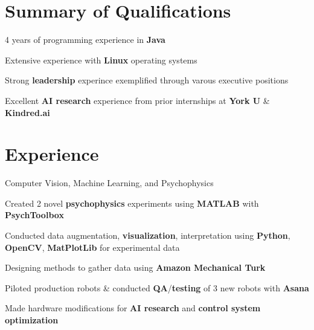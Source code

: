 \documentclass[]{chandan-cv}
\begin{document}
\hfill
\begin{minipage}[t]{0.66\textwidth} 


\section{Summary of Qualifications}
\runsubsection{ }
\descript{ }
\location{ }
\vspace{\topsep} %
\begin{tightemize}
	\item 4 years of programming experience in \textbf{Java}
	\item Extensive experience with \textbf{Linux} operating systems
	\item Strong \textbf{leadership} experince exemplified through varous executive positions
	\item Excellent \textbf{AI research} experience from prior internships at \textbf{York U} \& \textbf{Kindred.ai} 
\end{tightemize}
\sectionsep


\section{Experience}
\begin{tightemize}
	\item Computer Vision, Machine Learning, and Psychophysics
	\item Created 2 novel \textbf{psychophysics} experiments using \textbf{MATLAB} with \textbf{PsychToolbox}
	\item Conducted data augmentation, \textbf{visualization}, interpretation using \textbf{Python}, \textbf{OpenCV}, \textbf{MatPlotLib} for experimental data
	\item Designing methods to gather data using \textbf{Amazon Mechanical Turk}
\end{tightemize}
\sectionsep

\begin{tightemize}
	\item Piloted production robots \& conducted \textbf{QA}/\textbf{testing} of 3 new robots with \textbf{Asana}
	\item Made hardware modifications for \textbf{AI research} and \textbf{control system optimization}
\end{tightemize}
\sectionsep


\end{minipage}
\end{document}
